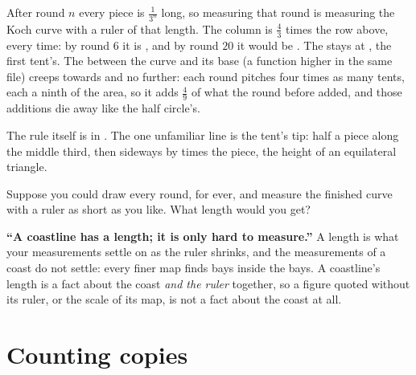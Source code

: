 

\noindent
After round $n$ every piece is $\tfrac{1}{3^{n}}$ long, so measuring that
round is measuring the Koch curve with a ruler of that length. The
 column is $\tfrac{4}{3}$ times the row above, every time: by
round $6$ it is , and by round $20$ it would be
. The  stays at ,
the first tent's. The  between the curve and its base (a function
higher in the same file) creeps towards  and no
further: each round pitches four times as many tents, each a ninth of the
area, so it adds $\tfrac{4}{9}$ of what the round before added, and those
additions die away like the half circle's.

The rule itself is  in . The one unfamiliar line is
the tent's tip: half a piece along the middle third, then sideways by
 times the piece, the height of an equilateral triangle.


\begin{think}
Suppose you could draw every round, for ever, and measure the finished curve
with a ruler as short as you like. What length would you get?
\end{think}

\begin{trapbox}
\textbf{\enquote{A coastline has a length; it is only hard to measure.}} A
length is what your measurements settle on as the ruler shrinks, and the
measurements of a coast do not settle: every finer map finds bays inside the
bays. A coastline's length is a fact about the coast \emph{and the ruler}
together, so a figure quoted without its ruler, or the scale of its map, is
not a fact about the coast at all.
\end{trapbox}

\section{Counting copies}
\label{sec:ch11-dimension}


